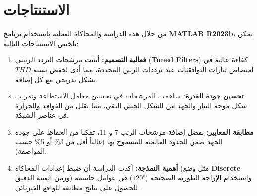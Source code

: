 \documentclass[12pt, a4paper, twoside]{article} %
\newcommand{\el}{\textenglish} %
\begin{document}
\section{الاستنتاجات}

من خلال هذه الدراسة والمحاكاة العملية باستخدام برنامج \el{\textbf{MATLAB R2023b}}، يمكن تلخيص الاستنتاجات التالية:

\begin{enumerate}
    \item \textbf{فعالية التصميم:} أثبتت مرشحات التردد الرنيني \el{(\textbf{Tuned Filters})} كفاءة عالية في امتصاص تيارات التوافقيات عند ترددات الرنين المحددة، مما أدى لخفض نسبة \el{$THD$} بشكل تدريجي مع كل إضافة.
    \item \textbf{تحسين جودة القدرة:} ساهمت المرشحات في تحسين معامل الاستطاعة وتقريب شكل موجة التيار والجهد من الشكل الجيبي النقي، مما يقلل من الفواقد والحرارة في عناصر الشبكة.
    \item \textbf{مطابقة المعايير:} بفضل إضافة مرشحات الرتب 7 و 11، تمكنا من الحفاظ على جودة الجهد ضمن الحدود العالمية المسموح بها (غالباً أقل من 3\% أو 5\% حسب المواصفة).
    \item \textbf{أهمية النمذجة:} أكدت الدراسة أن ضبط إعدادات المحاكاة (مثل وضع \el{\textbf{Discrete}} وزمن العينة الدقيق) واستخدام الإزاحة الطورية الصحيحة ($120^\circ$) هي عوامل حاسمة للحصول على نتائج مطابقة للواقع الفيزيائي.
\end{enumerate}
\end{document}
